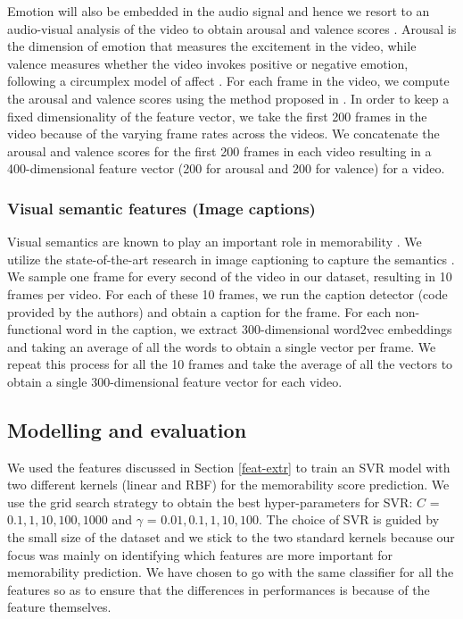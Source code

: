 \documentclass[sigconf]{acmart}
\begin{document}
Emotion will also be embedded in the audio signal and hence we resort to an audio-visual analysis of the video to obtain arousal and valence scores \cite{affect}.
Arousal is the dimension of emotion that measures the excitement in the video, while valence measures whether the video invokes positive or negative emotion, following a circumplex model of affect \cite{affect-model}.
For each frame in the video, we compute the arousal and valence scores using the method proposed in \cite{affect}.
In order to keep a fixed dimensionality of the feature vector, we take the first 200 frames in the video because of the varying frame rates across the videos.
We concatenate the arousal and valence scores for the first 200 frames in each video resulting in a 400-dimensional feature vector (200 for arousal and 200 for valence) for a video.

\subsubsection{Visual semantic features (Image captions)}
\label{sem-feat}
Visual semantics are known to play an important role in memorability \cite{sem-mem}.
We utilize the state-of-the-art research in image captioning to capture the semantics \cite{caption-feat}.
We sample one frame for every second of the video in our dataset, resulting in 10 frames per video.
For each of these 10 frames, we run the caption detector (code provided by the authors) and obtain a caption for the frame.
For each non-functional word in the caption, we extract 300-dimensional word2vec \cite{word2vec} embeddings and taking an average of all the words to obtain a single vector per frame.
We repeat this process for all the 10 frames and take the average of all the vectors to obtain a single 300-dimensional feature vector for each video.

\subsection{Modelling and evaluation}
\label{model-eval}
We used the features discussed in Section \ref{feat-extr} to train an SVR model with two different kernels (linear and RBF) for the memorability score prediction. 
We use the grid search strategy to obtain the best hyper-parameters for SVR: $C$ = ${0.1, 1, 10, 100, 1000}$ and $\gamma$ = ${0.01, 0.1, 1, 10, 100}$.
The choice of SVR is guided by the small size of the dataset and we stick to the two standard kernels because our focus was mainly on identifying which features are more important for memorability prediction.
We have chosen to go with the same classifier for all the features so as to ensure that the differences in performances is because of the feature themselves.
\end{document}

